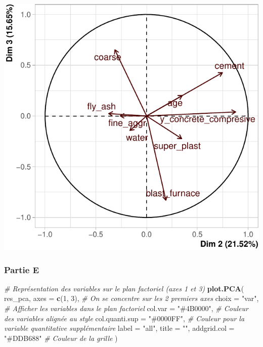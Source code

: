 \documentclass[
  12pt,
]{article}
\newenvironment{Shaded}{\begin{snugshade}}{\end{snugshade}}
\newcommand{\AttributeTok}[1]{\textcolor[rgb]{0.13,0.29,0.53}{#1}}
\newcommand{\CommentTok}[1]{\textcolor[rgb]{0.56,0.35,0.01}{\textit{#1}}}
\newcommand{\DecValTok}[1]{\textcolor[rgb]{0.00,0.00,0.81}{#1}}
\newcommand{\FunctionTok}[1]{\textcolor[rgb]{0.13,0.29,0.53}{\textbf{#1}}}
\newcommand{\NormalTok}[1]{#1}
\newcommand{\StringTok}[1]{\textcolor[rgb]{0.31,0.60,0.02}{#1}}
\begin{document}
\begin{center}\includegraphics{rmd_final_files/figure-latex/unnamed-chunk-36-1} \end{center}

\subsubsection{Partie E}\label{partie-e}

\begin{Shaded}
\begin{Highlighting}[]
\CommentTok{\# Représentation des variables sur le plan factoriel (axes 1 et 3)}
\FunctionTok{plot.PCA}\NormalTok{(}
\NormalTok{  res\_pca,}
  \AttributeTok{axes =} \FunctionTok{c}\NormalTok{(}\DecValTok{1}\NormalTok{, }\DecValTok{3}\NormalTok{),             }\CommentTok{\# On se concentre sur les 2 premiers axes}
  \AttributeTok{choix =} \StringTok{"var"}\NormalTok{,              }\CommentTok{\# Afficher les variables dans le plan factoriel}
  \AttributeTok{col.var =} \StringTok{"\#4B0000"}\NormalTok{,        }\CommentTok{\# Couleur des variables alignée au style}
  \AttributeTok{col.quanti.sup =} \StringTok{"\#0000FF"}\NormalTok{, }\CommentTok{\# Couleur pour la variable quantitative supplémentaire}
  \AttributeTok{label =} \StringTok{"all"}\NormalTok{,}
  \AttributeTok{title =} \StringTok{""}\NormalTok{,}
  \AttributeTok{addgrid.col =} \StringTok{"\#DDB688"}     \CommentTok{\# Couleur de la grille}
\NormalTok{)}
\end{Highlighting}
\end{Shaded}
\end{document}
